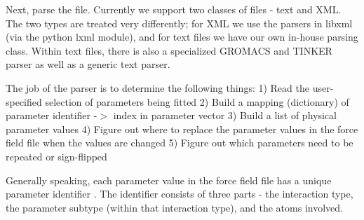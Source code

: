 \-Next, parse the file. \-Currently we support two classes of files -\/ text and \-X\-M\-L. \-The two types are treated very differently; for \-X\-M\-L we use the parsers in libxml (via the python lxml module), and for text files we have our own in-\/house parsing class. \-Within text files, there is also a specialized \-G\-R\-O\-M\-A\-C\-S and \-T\-I\-N\-K\-E\-R parser as well as a generic text parser.

\-The job of the parser is to determine the following things\-: 1) \-Read the user-\/specified selection of parameters being fitted 2) \-Build a mapping (dictionary) of {\ttfamily  parameter identifier -\/$>$ index in parameter vector } 3) \-Build a list of physical parameter values 4) \-Figure out where to replace the parameter values in the force field file when the values are changed 5) \-Figure out which parameters need to be repeated or sign-\/flipped

\-Generally speaking, each parameter value in the force field file has a {\ttfamily  unique parameter identifier {\ttfamily . \-The identifier consists of three parts -\/ the interaction type, the parameter subtype (within that interaction type), and the atoms involved.}}

{}

{}

{}

{}

{}

{}

